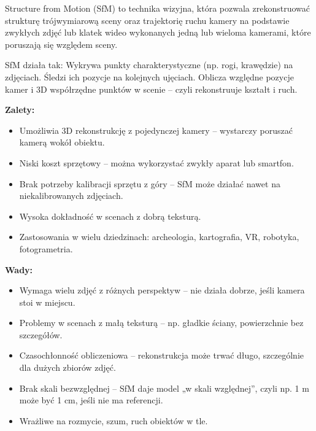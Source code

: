 \documentclass[magisterska]{pracadypl}
\begin{document}
Structure from Motion (SfM) to technika wizyjna, która pozwala zrekonstruować strukturę trójwymiarową sceny oraz trajektorię ruchu kamery na podstawie zwykłych zdjęć lub klatek wideo wykonanych jedną lub wieloma kamerami, które poruszają się względem sceny.

SfM działa tak:
Wykrywa punkty charakterystyczne (np. rogi, krawędzie) na zdjęciach.
Śledzi ich pozycje na kolejnych ujęciach.
Oblicza względne pozycje kamer i 3D współrzędne punktów w scenie – czyli rekonstruuje kształt i ruch.

\begin{minipage}[t]{0.45\textwidth}
\textbf{Zalety:}
\begin{itemize}
  \item Umożliwia 3D rekonstrukcję z pojedynczej kamery – wystarczy poruszać kamerą wokół obiektu.

  \item Niski koszt sprzętowy – można wykorzystać zwykły aparat lub smartfon.

  \item Brak potrzeby kalibracji sprzętu z góry – SfM może działać nawet na niekalibrowanych zdjęciach.

  \item Wysoka dokładność w scenach z dobrą teksturą.

  \item Zastosowania w wielu dziedzinach: archeologia, kartografia, VR, robotyka, fotogrametria.
\end{itemize}
\end{minipage}
\hfill
\begin{minipage}[t]{0.45\textwidth}
\textbf{Wady:}
\begin{itemize}
  \item Wymaga wielu zdjęć z różnych perspektyw – nie działa dobrze, jeśli kamera stoi w miejscu.

  \item Problemy w scenach z małą teksturą – np. gładkie ściany, powierzchnie bez szczegółów.

  \item Czasochłonność obliczeniowa – rekonstrukcja może trwać długo, szczególnie dla dużych zbiorów zdjęć.

  \item Brak skali bezwzględnej – SfM daje model „w skali względnej”, czyli np. 1 m może być 1 cm, jeśli nie ma referencji.

  \item Wrażliwe na rozmycie, szum, ruch obiektów w tle.
\end{itemize}
\end{minipage}
\end{document}
